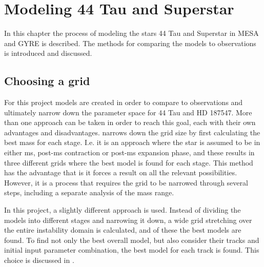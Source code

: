 \chapter{Modeling 44 Tau and Superstar}
\label{modeling}
In this chapter the process of modeling the stars 44 Tau and Superstar in MESA and GYRE is described. The methods for comparing the models to  observations is introduced and discussed.

\section{Choosing a grid}
\label{sec:grid}
For this project models are created in order to compare to observations and ultimately narrow down the parameter space for 44 Tau and HD 187547. More than one approach can be taken in order to reach this goal, each with their own advantages and disadvantages. \citep{lenz2010delta} narrows down the grid size by first calculating the best mass for each stage. I.e. it is an approach where the star is assumed to be in either ms, post-ms contraction or post-ms expansion phase, and these results in three different grids where the best model is found for each stage. This method has the advantage that is it forces a result on all the relevant possibilities. However, it is a process that requires the grid to be narrowed through several steps, including a separate analysis of the mass range. 

In this project, a slightly different approach is used. Instead of dividing the models into different stages and narrowing it down, a wide grid stretching over the entire instability domain is calculated, and of these the best models are found. To find not only the best overall model, but also consider their tracks and initial input parameter combination, the best model for each track is found. This choice is discussed in . 

